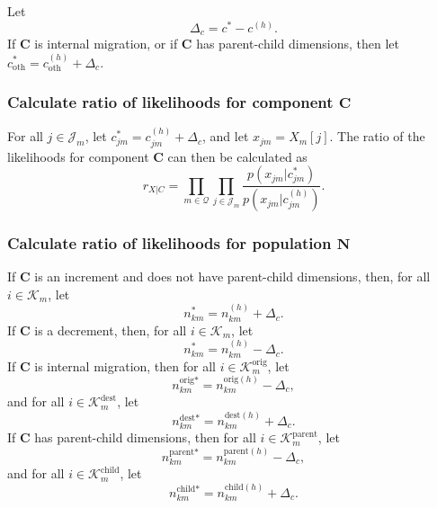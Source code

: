 \documentclass{article}
\begin{document}
Let
\begin{equation}
  \Delta_c = c^* - c^{(h)}.
\end{equation}
If $\bm{C}$ is internal migration, or if $\bm{C}$ has parent-child dimensions, then let $c_{\text{oth}}^* = c_{\text{oth}}^{(h)} + \Delta_c$.

\subsubsection{Calculate ratio of likelihoods for component $\bm{C}$}

For all $j \in \mathcal{J}_m$, let $c_{jm}^* = c_{jm}^{(h)} + \Delta_c$, and let $x_{jm} = X_m[j]$.  The ratio of the likelihoods for component $\bm{C}$ can then be calculated as
\begin{equation}
  r_{X|C} = \prod_{m \in \mathcal{Q}} \prod_{j \in \mathcal{J}_m} \frac{ p(x_{jm} | c_{jm}^*) }{ p(x_{jm} | c_{jm}^{(h)}) }.
\end{equation}


\subsubsection{Calculate ratio of likelihoods for population $\bm{N}$}

If $\bm{C}$ is an increment and does not have parent-child dimensions, then, for all $i \in \mathcal{K}_m$, let
\begin{equation}
  n_{km}^* =n_{km}^{(h)} + \Delta_c.
\end{equation}
If $\bm{C}$ is a decrement, then, for all $i \in \mathcal{K}_m$, let
\begin{equation}
  n_{km}^* =n_{km}^{(h)} - \Delta_c.
\end{equation}
If $\bm{C}$ is internal migration, then for all $i \in \mathcal{K}_m^{\text{orig}}$, let
\begin{equation}
  n_{km}^{\text{orig}*} =n_{km}^{\text{orig}(h)} - \Delta_c,
\end{equation}
and for all  $i \in \mathcal{K}_m^{\text{dest}}$, let
\begin{equation}
  n_{km}^{\text{dest}*} =n_{km}^{\text{dest}(h)} + \Delta_c.
\end{equation}
If $\bm{C}$ has parent-child dimensions, then for all $i \in \mathcal{K}_m^{\text{parent}}$, let
\begin{equation}
  n_{km}^{\text{parent}*} =n_{km}^{\text{parent}(h)} - \Delta_c,
\end{equation}
and for all  $i \in \mathcal{K}_m^{\text{child}}$, let
\begin{equation}
  n_{km}^{\text{child}*} =n_{km}^{\text{child}(h)} + \Delta_c.
\end{equation}
\end{document}
